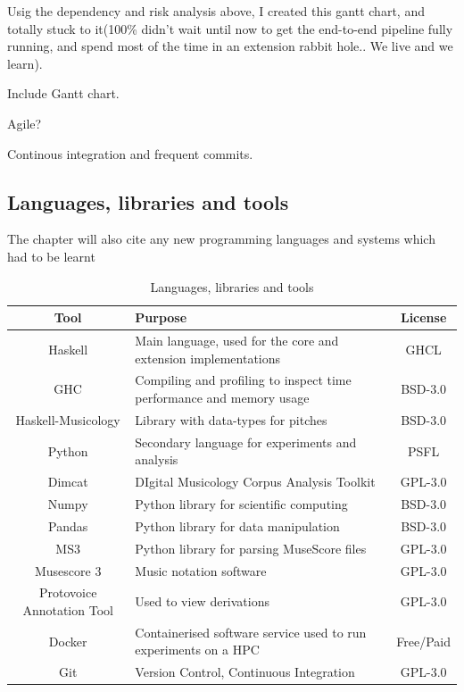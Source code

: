 \documentclass[12pt,a4paper,twoside,openright]{report}
\theoremstyle{definition}
\begin{document}
Usig the dependency and risk analysis above, I created this gantt chart, and totally stuck to it(100\% didn't wait until now to get the end-to-end pipeline fully running, and spend most of the time in an extension rabbit hole.. We live and we learn).

Include Gantt chart.

Agile? 

Continous integration and frequent commits.

\subsection{Languages, libraries and tools}
The chapter will also cite any new programming languages and systems which had to be learnt 

\begin{table}
  {
  \small
  \caption{Languages, libraries and tools}
  \label{Languages}
  \begin{center}
    \begin{tabularx}{.9\textwidth}{cXc}
      {\large \textbf{Tool}} & {\large \textbf{Purpose}} & {\large \textbf{License}} \\
      \toprule
      Haskell & Main language, used for the core and extension implementations & GHCL \\
      \midrule
      GHC & Compiling and profiling to inspect time performance and memory usage  & BSD-3.0 \\
      \midrule
      Haskell-Musicology & Library with data-types for pitches & BSD-3.0 \\
      \midrule
      Python & Secondary language for experiments and analysis & PSFL \\
      \midrule
      Dimcat & DIgital Musicology Corpus Analysis Toolkit & GPL-3.0 \\
      \midrule
      Numpy & Python library for scientific computing & BSD-3.0 \\
      \midrule
      Pandas & Python library for data manipulation & BSD-3.0 \\
      \midrule
      MS3 & Python library for parsing MuseScore files & GPL-3.0 \\
      \midrule
      Musescore 3 & Music notation software & GPL-3.0 \\
      \midrule
      Protovoice Annotation Tool & Used to view derivations & GPL-3.0 \\
      \midrule
      Docker & Containerised software service used to run experiments on a HPC & Free/Paid \\
      \midrule
      Git & Version Control, Continuous Integration & GPL-3.0 \\
      \bottomrule
    \end{tabularx}
  \end{center}
  }
\end{table}
\end{document}
